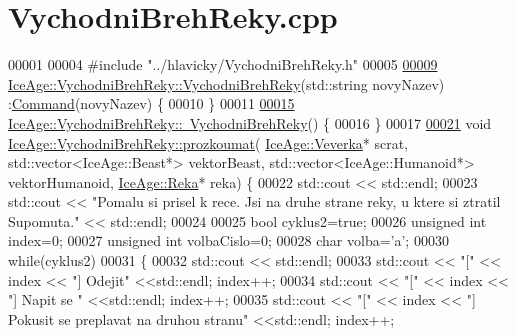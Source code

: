 \hypertarget{VychodniBrehReky_8cpp_source}{}\section{Vychodni\+Breh\+Reky.\+cpp}
\label{VychodniBrehReky_8cpp_source}

\begin{DoxyCode}
00001 
00004 \textcolor{preprocessor}{#include "../hlavicky/VychodniBrehReky.h"}
00005 
\hypertarget{VychodniBrehReky_8cpp_source.tex_l00009}{}\hyperlink{classIceAge_1_1VychodniBrehReky_a9d5257fc3109d8ee985e16c412bbe40d}{00009} \hyperlink{classIceAge_1_1VychodniBrehReky_a9d5257fc3109d8ee985e16c412bbe40d}{IceAge::VychodniBrehReky::VychodniBrehReky}(std::string novyNazev)
      :\hyperlink{classIceAge_1_1Command}{Command}(novyNazev) \{
00010 \}
00011 
\hypertarget{VychodniBrehReky_8cpp_source.tex_l00015}{}\hyperlink{classIceAge_1_1VychodniBrehReky_a3b71658a8879f9961ad778006db54ea9}{00015} \hyperlink{classIceAge_1_1VychodniBrehReky_a3b71658a8879f9961ad778006db54ea9}{IceAge::VychodniBrehReky::~VychodniBrehReky}() \{
00016 \}
00017 
\hypertarget{VychodniBrehReky_8cpp_source.tex_l00021}{}\hyperlink{classIceAge_1_1VychodniBrehReky_a9be648ec1c37e14c3532813685fe1ee1}{00021} \textcolor{keywordtype}{void} \hyperlink{classIceAge_1_1VychodniBrehReky_a9be648ec1c37e14c3532813685fe1ee1}{IceAge::VychodniBrehReky::prozkoumat}(
      \hyperlink{classIceAge_1_1Veverka}{IceAge::Veverka}* scrat, std::vector<IceAge::Beast*> vektorBeast, 
      std::vector<IceAge::Humanoid*> vektorHumanoid, \hyperlink{classIceAge_1_1Reka}{IceAge::Reka}* reka) \{
00022     std::cout << std::endl;
00023     std::cout << \textcolor{stringliteral}{"Pomalu si prisel k rece. Jsi na druhe strane reky, u ktere si ztratil Supomuta."} << 
      std::endl;
00024 
00025     \textcolor{keywordtype}{bool} cyklus2=\textcolor{keyword}{true};
00026     \textcolor{keywordtype}{unsigned} \textcolor{keywordtype}{int} index=0;
00027     \textcolor{keywordtype}{unsigned} \textcolor{keywordtype}{int} volbaCislo=0;
00028     \textcolor{keywordtype}{char} volba=\textcolor{charliteral}{'a'};
00030     \textcolor{keywordflow}{while}(cyklus2)
00031         \{
00032             std::cout << std::endl;
00033             std::cout << \textcolor{stringliteral}{"["} << index << \textcolor{stringliteral}{"] Odejit"} <<std::endl; index++;
00034             std::cout << \textcolor{stringliteral}{"["} << index << \textcolor{stringliteral}{"] Napit se "} <<std::endl; index++;
00035             std::cout << \textcolor{stringliteral}{"["} << index << \textcolor{stringliteral}{"] Pokusit se preplavat na druhou stranu"} <<std::endl; index++;

\end{DoxyCode}
